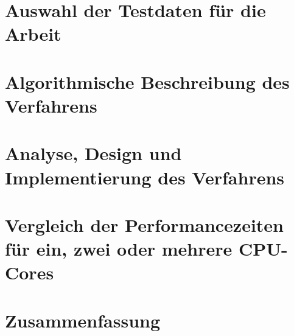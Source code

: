 \documentclass[11pt]{scrreprt} %
\theoremstyle{definition}
\begin{document}
\chapter{Auswahl der Testdaten für die Arbeit}

\chapter{Algorithmische Beschreibung des Verfahrens}

\chapter{Analyse, Design und Implementierung des Verfahrens}

\chapter{Vergleich der Performancezeiten für ein, zwei oder mehrere CPU-Cores}

\chapter{Zusammenfassung}




\listoffigures
\listoftables
\end{document}
